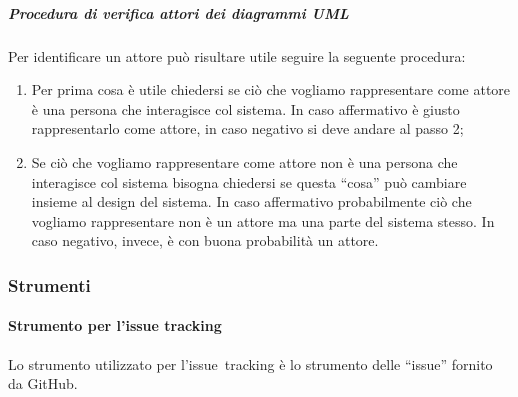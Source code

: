 \documentclass[../NormeProgetto.tex]{subfiles}
\begin{document}
		
		\subparagraph{Procedura di verifica attori dei diagrammi UML}\label{par:Procedura di verifica degli attori dei diagrammi UML}
		Per identificare un attore può risultare utile seguire la seguente procedura:
			\begin{enumerate}
				\item Per prima cosa è utile chiedersi se ciò che vogliamo rappresentare come attore è una persona che interagisce col sistema. In caso affermativo è giusto rappresentarlo come attore, in caso negativo si deve andare al passo 2;
				\item Se ciò che vogliamo rappresentare come attore non è una persona che interagisce col sistema bisogna chiedersi se questa ``cosa'' può cambiare insieme al design del sistema. In caso affermativo probabilmente ciò che vogliamo rappresentare non è un attore ma una parte del sistema stesso. In caso negativo, invece, è con buona probabilità un attore.
			\end{enumerate}
	
	\subsubsection{Strumenti} \label{sec:Strumenti}
		\paragraph{Strumento per l'issue tracking} \label{par:IssueTrk GitHub}
		Lo strumento utilizzato per l'issue\g\ tracking è lo strumento delle ``issue'' fornito da GitHub\g.
		
\end{document}
